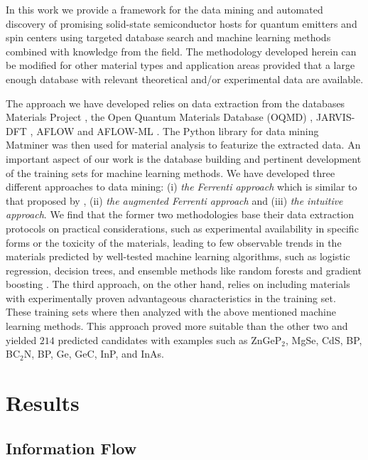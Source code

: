 \documentclass[superscriptaddress,unsortedaddress,
 amsmath,amssymb,
 aps,
]{revtex4-2}
\begin{document}
In this work we provide a framework for the data mining and automated discovery of promising solid-state semiconductor hosts for quantum emitters and spin centers using targeted database search and machine learning methods combined with knowledge from the field. The methodology developed herein can be modified for other material types and application areas provided that a large enough database with relevant theoretical and/or experimental data are available. 

The approach we have developed relies on data extraction from the databases Materials Project \cite{Jain2013,Jain2018}, the Open Quantum Materials Database (OQMD) \cite{Saal2013, Kirklin2015}, JARVIS-DFT \cite{Choudhary2020}, AFLOW \cite{Curtarolo2012, Curtarolo2012a, Calderon2015} and AFLOW-ML \cite{Isayev2017}. 
The Python library for data mining Matminer \cite{Ward2018} was then used for material analysis to featurize the extracted data. An important aspect of our work is the database building and pertinent development of the training sets for machine learning methods. We have developed three different approaches to data mining: (i) \emph{the Ferrenti approach} which is similar to that proposed by \citeauthor{Ferrenti2020}  \cite{Ferrenti2020}, (ii) \emph{the augmented Ferrenti approach} and (iii) \emph{the intuitive approach}. We find that the former two methodologies base their data extraction protocols on practical considerations, such as experimental availability in specific forms or the toxicity of the materials, leading to few observable trends in the materials predicted by well-tested machine learning algorithms, such as logistic regression, decision trees, and ensemble methods like random forests and gradient boosting \cite{Mehta2019,Hastie2009}. The third approach, on the other hand, relies on including materials with experimentally proven advantageous characteristics in the training set. These training sets where then analyzed with the above mentioned machine learning methods. This approach proved more suitable than the other two and yielded $214$ predicted candidates 
with examples such as ZnGeP$_2$, MgSe, CdS, BP, BC$_2$N, BP, Ge, GeC, InP, and InAs. 

\section*{Results}

\subsection*{Information Flow} 
\end{document}
